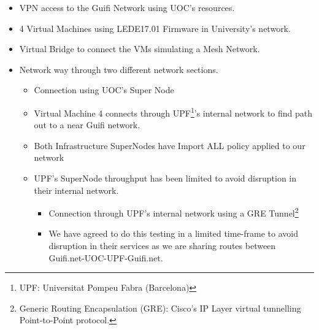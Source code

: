 \begin{itemize}
    \item VPN access to the Guifi Network using UOC's resources.
    \item 4 Virtual Machines using LEDE17.01 Firmware in University's network.
    \item Virtual Bridge to connect the VMs simulating a Mesh Network.
    \item Network way through two different network sections.
    \begin{itemize}
        \item Connection using UOC's Super Node
        \item Virtual Machine 4 connects through UPF\footnote{UPF: Universitat Pompeu Fabra (Barcelona)}'s internal network to find path out to a near Guifi network.
        \item Both Infrastructure SuperNodes have Import ALL policy applied to our network
        \item UPF's SuperNode throughput has been limited to avoid disruption in their internal network.
        \begin{itemize}
            \item Connection through UPF's internal network using a GRE Tunnel\footnote{Generic Routing Encapsulation (GRE): Cisco's IP Layer virtual tunnelling Point-to-Point protocol.}
            \item We have agreed to do this testing in a limited time-frame to avoid disruption in their services as we are sharing routes between Guifi.net-UOC-UPF-Guifi.net.
        \end{itemize}
    \end{itemize}
\end{itemize}

